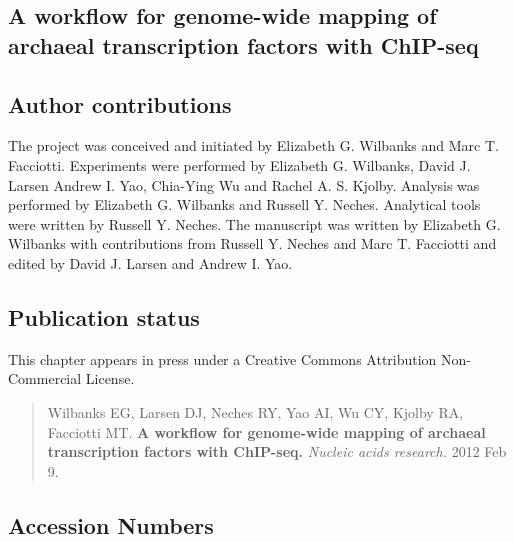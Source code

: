 \begin{refsection}

\chapter{A workflow for genome-wide mapping of archaeal transcription factors with ChIP-seq }


\section{Author contributions}

The project was conceived and initiated by Elizabeth G. Wilbanks and
Marc T. Facciotti. Experiments were performed by Elizabeth G.
Wilbanks, David J. Larsen Andrew I. Yao, Chia-Ying Wu and Rachel A. S.
Kjolby. Analysis was performed by Elizabeth G. Wilbanks and Russell Y.
Neches. Analytical tools were written by Russell Y. Neches. The
manuscript was written by Elizabeth G. Wilbanks with contributions
from Russell Y. Neches and Marc T. Facciotti and edited by David J.
Larsen and Andrew I. Yao.


\clearpage

\section{Publication status}

This chapter appears in press under a Creative Commons Attribution
Non-Commercial License.

\begin{quote}
Wilbanks EG, Larsen DJ, Neches RY, Yao AI, Wu CY, Kjolby RA, Facciotti
MT. {\bf A workflow for genome-wide mapping of archaeal transcription
factors with ChIP-seq.} {\em Nucleic acids research.} 2012 Feb 9.
\end{quote}







\section{Accession Numbers}


\end{refsection}
